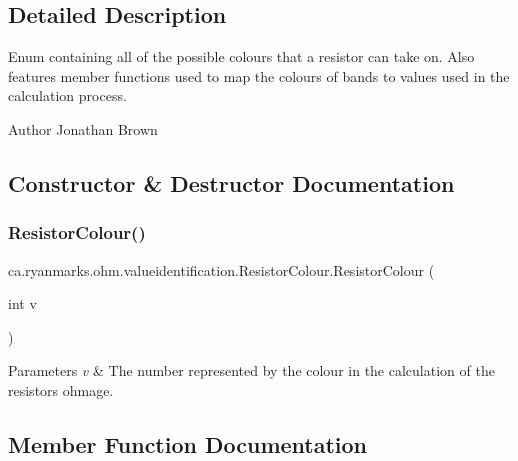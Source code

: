 \subsection{Detailed Description}
Enum containing all of the possible colours that a resistor can take on. Also features member functions used to map the colours of bands to values used in the calculation process. 

\begin{DoxyAuthor}{Author}
Jonathan Brown 
\end{DoxyAuthor}


\subsection{Constructor \& Destructor Documentation}
\hypertarget{enumca_1_1ryanmarks_1_1ohm_1_1valueidentification_1_1_resistor_colour_acb42e95aa5bb7456ab3b527860b463a1}{}\label{enumca_1_1ryanmarks_1_1ohm_1_1valueidentification_1_1_resistor_colour_acb42e95aa5bb7456ab3b527860b463a1} 
\subsubsection{\texorpdfstring{Resistor\+Colour()}{ResistorColour()}}
{\footnotesize\ttfamily ca.\+ryanmarks.\+ohm.\+valueidentification.\+Resistor\+Colour.\+Resistor\+Colour (\begin{DoxyParamCaption}\item[{int}]{v }\end{DoxyParamCaption})}


\begin{DoxyParams}{Parameters}
{\em v} & The number represented by the colour in the calculation of the resistor\textquotesingle{}s ohmage. \\
\hline
\end{DoxyParams}


\subsection{Member Function Documentation}
\hypertarget{enumca_1_1ryanmarks_1_1ohm_1_1valueidentification_1_1_resistor_colour_a1f68c450e6879bce8909fca12402a1d7}{}\label{enumca_1_1ryanmarks_1_1ohm_1_1valueidentification_1_1_resistor_colour_a1f68c450e6879bce8909fca12402a1d7} 
